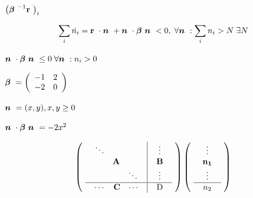 {\newpage\clearpage
{}%
$\left(\mbox{\boldmath {$\beta$ }}^{-1}\mbox{${\bf r}$ }\right)_i$%
\lthtmlinlinemathZ
\hfill\lthtmlcheckvsize\clearpage}

{\newpage\clearpage
{}%
\begin{displaymath}
\sum_i\dot{n_i}=\mbox{${\bf r}$ }\cdot\mbox{\boldmath {$n$ }}+ \mbox{\boldmath {$n$ }}\cdot\mbox{\boldmath {$\beta$ }}\mbox{\boldmath {$n$ }}< 0, \;\forall \mbox{\boldmath {$n$ }}:
\sum_in_i>N \;\exists N
\end{displaymath}%
\lthtmldisplayZ
\hfill\lthtmlcheckvsize\clearpage}

{\newpage\clearpage
{}%
$\mbox{\boldmath {$n$ }}\cdot\mbox{\boldmath {$\beta$ }}\mbox{\boldmath {$n$ }}\leq0
\; \forall\mbox{\boldmath {$n$ }}: n_i>0$%
\lthtmlinlinemathZ
\hfill\lthtmlcheckvsize\clearpage}

{\newpage\clearpage
{}%
$\mbox{\boldmath {$\beta$ }}=\left(\begin{array}{cc}
-1 & 2\\
-2 & 0\\
\end{array}\right)$%
\lthtmlinlinemathZ
\hfill\lthtmlcheckvsize\clearpage}

{\newpage\clearpage
{}%
$\mbox{\boldmath {$n$ }}=(x,y), x,y\geq0$%
\lthtmlinlinemathZ
\hfill\lthtmlcheckvsize\clearpage}

{\newpage\clearpage
{}%
$\mbox{\boldmath {$n$ }}\cdot\mbox{\boldmath {$\beta$ }}\mbox{\boldmath {$n$ }}=-2x^2$%
\lthtmlinlinemathZ
\hfill\lthtmlcheckvsize\clearpage}

{\newpage\clearpage
{}%
\begin{displaymath}\left(
  \mbox{
     \begin{tabular}{c|c}
       $\begin{array}{ccc}\ddots\\&{\bf A}\\&&\ddots\end{array}$\space & 
       $\begin{array}{c}\vdots\\{\bf B}\\\vdots\end{array}$\space \\
       \hline
       $\begin{array}{ccc}\cdots&{\bf C}&\cdots\end{array}$\space & D
     \end{tabular}
   }
\right)
\left(
  \mbox{
     \begin{tabular}{c}
     $\begin{array}{c}\vdots\\{\bf n_1}\\\vdots\end{array}$\\
     \hline
     $n_2$      \end{tabular}
    }
\right)
\end{displaymath}%
\lthtmldisplayZ
\hfill\lthtmlcheckvsize\clearpage}

